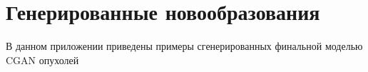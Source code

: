 \documentclass[times,specification,annotation]{itmo-student-thesis}
\begin{document}



\tableofcontents

\startprefacepage
















\printmainbibliography

\appendix

\chapter{Генерированные новообразования}\label{sec:app:1}

В данном приложении приведены примеры сгенерированных финальной моделью CGAN опухолей
\end{document}
